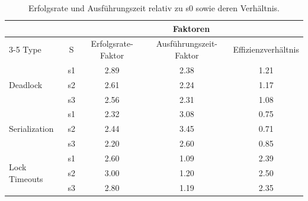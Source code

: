 
\begin{table}[htbp]
	\centering
	\smallsize
	\begin{tabular}{l|c|ccc}
		\toprule
		& & \multicolumn{3}{c}{Faktoren} \\
		\cmidrule(lr){3-5}
		Type & S & Erfolgsrate-Faktor & Ausführungszeit-Faktor & Effizienzverhältnis \\
		\midrule
		\multirow{3}{*}{Deadlock}
		& s1 & 2.89 & 2.38 & 1.21 \\
		& s2 & 2.61 & 2.24 & 1.17 \\
		& s3 & 2.56 & 2.31 & 1.08 \\
		\midrule
		\multirow{3}{*}{Serialization}
		& s1 & 2.32 & 3.08 & 0.75 \\
		& s2 & 2.44 & 3.45 & 0.71 \\
		& s3 & 2.20 & 2.60 & 0.85 \\
		\midrule
		\multirow{3}{*}{Lock Timeouts}
		& s1 & 2.60 & 1.09 & 2.39 \\
		& s2 & 3.00 & 1.20 & 2.50 \\
		& s3 & 2.80 & 1.19 & 2.35 \\
		\bottomrule
	\end{tabular}
	\caption{Erfolgsrate und Ausführungszeit relativ zu s0 sowie deren Verhältnis.}
	\label{tab:rDeadlocks}
\end{table}